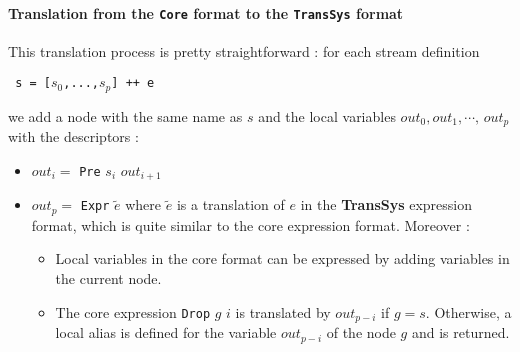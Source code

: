 \paragraph{Translation from the \texttt{Core} format to the \texttt{TransSys} format}

This translation process is pretty straightforward : for each stream definition
\begin{center}\texttt{ s = [$s_0$,...,$s_p$] ++ e}\end{center}
we add a node with the same name as $s$ and the local variables $out_0, out_1, \cdots, \, out_p$ with the descriptors :

\begin{itemize}
\item $out_{i} = $  \texttt{Pre} $s_i$  $out_{i + 1}$
\item $out_{p} = $  \texttt{Expr} $\tilde e$  where $\tilde e$ is a translation of $e$ in the \textbf{TransSys} expression format, which is quite similar to the core expression format. Moreover :

\begin{itemize}
\item Local variables in the core format can be expressed by adding variables in the current node.
\item The core expression \texttt{Drop} $g$ $i$ is translated by $out_{p - i}$ if $g = s$. Otherwise, a local alias is defined for the variable $out_{p - i}$ of the node $g$ and is returned.
\end{itemize}

\end{itemize}
